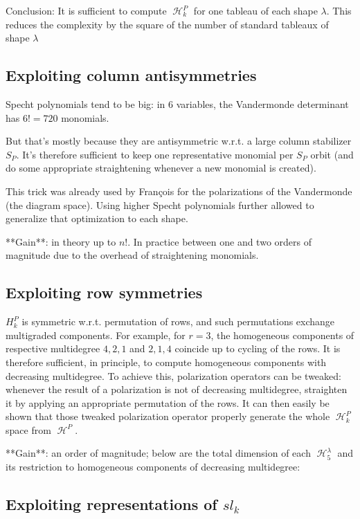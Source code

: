 \documentclass[letter,12pt]{article}
\DeclareMathOperator{\harmonics}{\mathcal{H}}
\begin{document}
	Conclusion: It is sufficient to compute $\harmonics_k^P$ for one tableau of each shape $\lambda$. This reduces the complexity by the square of the number of standard tableaux of shape $\lambda$
	
	\subsection{Exploiting column antisymmetries}
	
	Specht polynomials tend to be big: in $6$ variables, the Vandermonde determinant has $6!=720$ monomials.
	
	But that's mostly because they are antisymmetric w.r.t. a large column stabilizer $S_P$. It's therefore sufficient to keep one representative monomial per $S_P$ orbit (and do some appropriate straightening whenever a new monomial is created). 
	
	This trick was already used by François for the polarizations of the Vandermonde (the diagram space). Using higher Specht polynomials further allowed  to generalize that optimization to each shape.
	
	**Gain**: in theory up to $n!$. In practice between one and two orders of magnitude due to the overhead of straightening monomials.
	
	\subsection{Exploiting row symmetries}
	
	$H_k^P$ is symmetric w.r.t. permutation of rows, and such permutations
	exchange multigraded components. For example, for $r=3$, the homogeneous components of respective multidegree $4,2,1$ and $2,1,4$ coincide
	up to cycling of the rows. It is therefore sufficient, in principle, to compute homogeneous components with decreasing multidegree.
	To achieve this, polarization operators can be tweaked: whenever the result of a polarization is not of decreasing multidegree, straighten it by applying an appropriate permutation of the rows. It can then easily be shown that those tweaked polarization operator properly generate the whole $\harmonics_k^P$ space from $\harmonics^P$.
	
	**Gain**: an order of magnitude; below are the total dimension of each $\harmonics_5^\lambda$ and its restriction to homogeneous components of decreasing multidegree:
	
	\subsection{Exploiting representations of $sl_k$}
	
\end{document}
